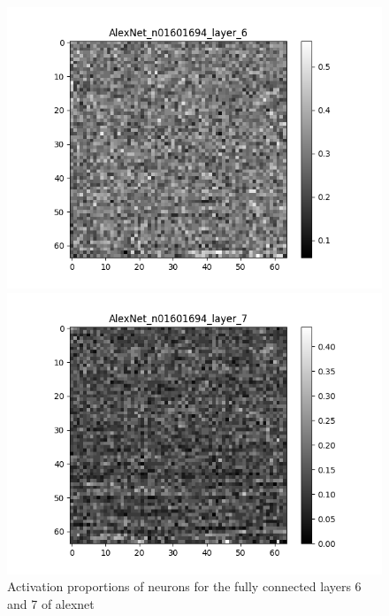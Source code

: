 \documentclass{article}
\begin{document}
        \begin{figure}[H]
            \centering
            \begin{minipage}{0.45\textwidth}
                \centering
                \includegraphics[width=\textwidth]{images/AlexNet_n01601694_layer_6.png} %
                
            \end{minipage}\hfill
            \begin{minipage}{0.45\textwidth}
                \centering
                \includegraphics[width=\textwidth]{images/AlexNet_n01601694_layer_7.png} %
            \end{minipage}
            \caption{Activation proportions of neurons for the fully connected layers 6 and 7 of alexnet}
            \label{fig:neuron_activation_pattern}
        \end{figure}
        
\end{document}
